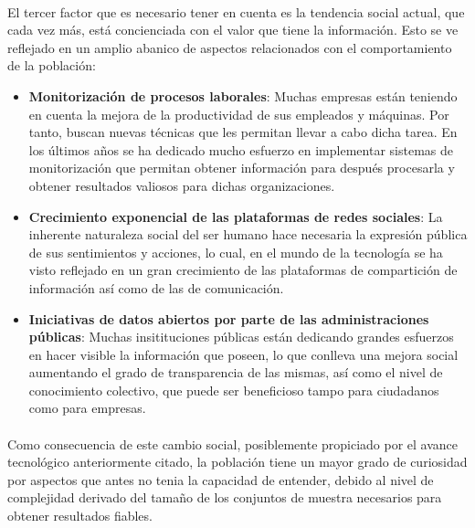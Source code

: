 \documentclass{subfiles}
\begin{document}
    \paragraph{}
    El tercer factor que es necesario tener en cuenta es la tendencia social actual, que cada vez más, está concienciada con el valor que tiene la información. Esto se ve reflejado en un amplio abanico de aspectos relacionados con el comportamiento de la población:

    \begin{itemize}

      \item \textbf{Monitorización de procesos laborales}: Muchas empresas están teniendo en cuenta la mejora de la productividad de sus empleados y máquinas. Por tanto, buscan nuevas técnicas que les permitan llevar a cabo dicha tarea. En los últimos años se ha dedicado mucho esfuerzo en implementar sistemas de monitorización que permitan obtener información para después procesarla y obtener resultados valiosos para dichas organizaciones.

      \item \textbf{Crecimiento exponencial de las plataformas de redes sociales}: La inherente naturaleza social del ser humano hace necesaria la expresión pública de sus sentimientos y acciones, lo cual, en el mundo de la tecnología se ha visto reflejado en un gran crecimiento de las plataformas de compartición de información así como de las de comunicación.

      \item \textbf{Iniciativas de datos abiertos por parte de las administraciones públicas}: Muchas insitituciones públicas están dedicando grandes esfuerzos en hacer visible la información que poseen, lo que conlleva una mejora social aumentando el grado de transparencia de las mismas, así como el nivel de conocimiento colectivo, que puede ser beneficioso tampo para ciudadanos como para empresas.

    \end{itemize}

    \paragraph{}
    Como consecuencia de este cambio social, posiblemente propiciado por el avance tecnológico anteriormente citado, la población tiene un mayor grado de curiosidad por aspectos que antes no tenia la capacidad de entender, debido al nivel de complejidad derivado del tamaño de los conjuntos de muestra necesarios para obtener resultados fiables.
\end{document}
